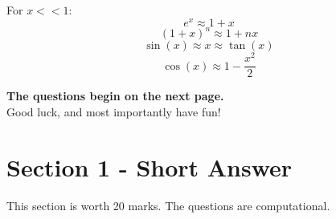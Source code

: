 \documentclass{exam}
\begin{document}
\vspace{20pt}
For $x << 1$:
$$ e^x \approx 1 + x $$
$$ (1+x)^n \approx 1 + nx $$
$$ \sin(x) \approx x \approx \tan(x) $$
$$ \cos(x) \approx 1 - \frac{x^2}{2} $$

\textbf{The questions begin on the next page.}\\
\vspace{10pt}
Good luck, and most importantly have fun!



\newpage
\section*{Section 1 - Short Answer}
This section is worth 20 marks. The questions are computational.
\vspace{20pt}
\end{document}
